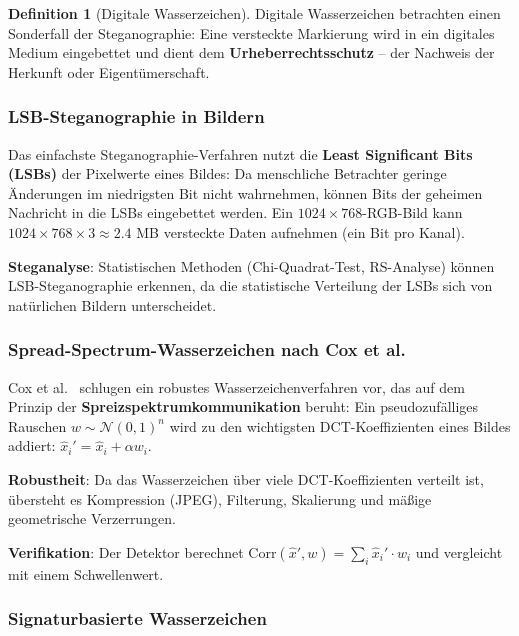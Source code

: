 ﻿\documentclass[a4paper,12pt]{scrreprt}
\theoremstyle{definition}
\newtheorem{definition}{Definition}[section]
\begin{document}
\begin{definition}[Digitale Wasserzeichen]
Digitale Wasserzeichen \cite{Cox97} betrachten einen Sonderfall der Steganographie: Eine versteckte Markierung wird in ein digitales Medium eingebettet und dient dem \textbf{Urheberrechtsschutz} -- der Nachweis der Herkunft oder Eigentümerschaft.
\end{definition}

\subsubsection{LSB-Steganographie in Bildern}

Das einfachste Steganographie-Verfahren nutzt die \textbf{Least Significant Bits (LSBs)} der Pixelwerte eines Bildes: Da menschliche Betrachter geringe Änderungen im niedrigsten Bit nicht wahrnehmen, können Bits der geheimen Nachricht in die LSBs eingebettet werden. Ein $1024\times768$-RGB-Bild kann $1024 \times 768 \times 3 \approx 2.4$ MB versteckte Daten aufnehmen (ein Bit pro Kanal).

\textbf{Steganalyse}: Statistischen Methoden (Chi-Quadrat-Test, RS-Analyse) können LSB-Steganographie erkennen, da die statistische Verteilung der LSBs sich von natürlichen Bildern unterscheidet.

\subsubsection{Spread-Spectrum-Wasserzeichen nach Cox et al.}

Cox et al.\ \cite{Cox97} schlugen ein robustes Wasserzeichenverfahren vor, das auf dem Prinzip der \textbf{Spreizspektrumkommunikation} beruht: Ein pseudozufälliges Rauschen $w \sim \mathcal{N}(0,1)^n$ wird zu den wichtigsten DCT-Koeffizienten eines Bildes addiert: $\hat{x}_i' = \hat{x}_i + \alpha w_i$.

\textbf{Robustheit}: Da das Wasserzeichen über viele DCT-Koeffizienten verteilt ist, übersteht es Kompression (JPEG), Filterung, Skalierung und mäßige geometrische Verzerrungen.

\textbf{Verifikation}: Der Detektor berechnet $\mathrm{Corr}(\hat{x}', w) = \sum_i \hat{x}_i' \cdot w_i$ und vergleicht mit einem Schwellenwert.

\subsubsection{Signaturbasierte Wasserzeichen}
\end{document}
